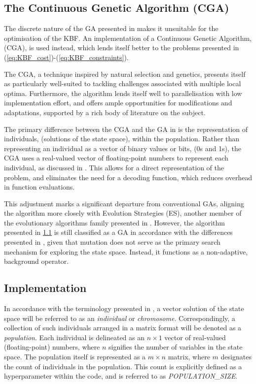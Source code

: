 \documentclass[10pt]{article}
\begin{document}
\begin{multicols}{2}
\section{The Continuous Genetic Algorithm (CGA)}
\label{sec:CGA}

The discrete nature of the GA presented in \cite{parks2023geneticalgorithms} makes it unsuitable for the optimisation of the KBF. An implementation of a Continuous Genetic Algorithm, (CGA), is used instead, which lends itself better to the problems presented in (\ref{eq:KBF_cost})-(\ref{eq:KBF_constraints}).

The CGA, a technique inspired by natural selection and genetics, presents itself as particularly well-suited to tackling challenges associated with multiple local optima. Furthermore, the algorithm lends itself well to parallelisation with low implementation effort, and offers ample opportunities for modifications and adaptations, supported by a rich body of literature on the subject.

The primary difference between the CGA and the GA in \cite{parks2023geneticalgorithms} is the representation of individuals, (solutions of the state space), within the population. Rather than representing an individual as a vector of binary values or bits, (0s and 1s), the CGA uses a real-valued vector of floating-point numbers to represent each individual, as discussed in \cite{PGA}. This allows for a direct representation of the problem, and eliminates the need for a decoding function, which reduces overhead in function evaluations.

This adjustment marks a significant departure from conventional GAs, aligning the algorithm more closely with Evolution Strategies (ES), another member of the evolutionary algorithms family presented in \cite{salimans2017evolution}. However, the algorithm presented in \ref{sec:CGA_implementation} is still classified as a GA in accordance with the differences presented in \cite{10.1007/BFb0029787}, given that mutation does not serve as the primary search mechanism for exploring the state space. Instead, it functions as a non-adaptive, background operator.

\subsection{Implementation}
\label{sec:CGA_implementation}

In accordance with the terminology presented in \cite{parks2023geneticalgorithms}, a vector solution of the state space will be referred to as an \textit{individual} or \textit{chromosome}. Correspondingly, a collection of such individuals arranged in a matrix format will be denoted as a \textit{population}. Each individual is delineated as an $n \times 1$ vector of real-valued (floating-point) numbers, where $n$ signifies the number of variables in the state space. The population itself is represented as a $m \times n$ matrix, where $m$ designates the count of individuals in the population. This count is explicitly defined as a hyperparameter within the code, and is referred to as \textit{POPULATION\_SIZE}.


\end{multicols}
\end{document}
